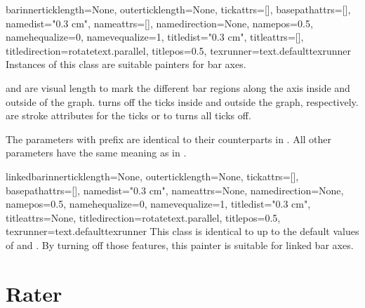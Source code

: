 \begin{classdesc}{bar}{innerticklength=None,
                       outerticklength=None,
                       tickattrs=[],
                       basepathattrs=[],
                       namedist="0.3 cm",
                       nameattrs=[],
                       namedirection=None,
                       namepos=0.5,
                       namehequalize=0,
                       namevequalize=1,
                       titledist="0.3 cm",
                       titleattrs=[],
                       titledirection=rotatetext.parallel,
                       titlepos=0.5,
                       texrunner=text.defaulttexrunner}
  Instances of this class are suitable painters for bar axes.

   and  are visual \PyX{}
  length to mark the different bar regions along the axis inside and
  outside of the graph.  turns off the ticks inside and
  outside the graph, respectively.  are stroke
  attributes for the ticks or  to turns all ticks off.

  The parameters with prefix  are identical to their
   counterparts in . All other parameters have
  the same meaning as in .
\end{classdesc}

\begin{classdesc}{linkedbar}{innerticklength=None,
                             outerticklength=None,
                             tickattrs=[],
                             basepathattrs=[],
                             namedist="0.3 cm",
                             nameattrs=None,
                             namedirection=None,
                             namepos=0.5,
                             namehequalize=0,
                             namevequalize=1,
                             titledist="0.3 cm",
                             titleattrs=None,
                             titledirection=rotatetext.parallel,
                             titlepos=0.5,
                             texrunner=text.defaulttexrunner}
  This class is identical to  up to the default values of
   and . By turning off those features,
  this painter is suitable for linked bar axes.
\end{classdesc}

\section{Rater}

